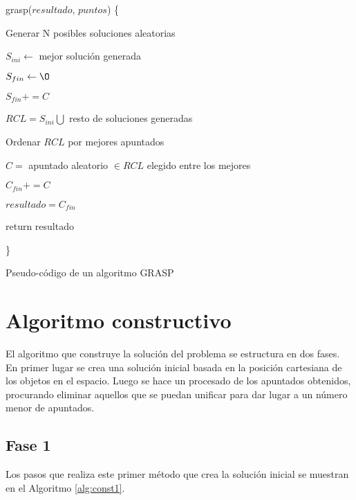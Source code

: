 \begin{algorithm}[H]
grasp($resultado$, $puntos$) \{

	Generar N posibles soluciones aleatorias
  
  $S_{ini} \leftarrow$ mejor solución generada

  $S_{fin} \leftarrow \O$

   {

     {$S_{fin} += C$}
  }

  $RCL = S_{ini}\bigcup$ resto de soluciones generadas

	Ordenar $RCL$ por mejores apuntados

   { %

  	$C = $ apuntado aleatorio $\in RCL$ elegido entre los mejores

    $C_{fin} += C$
  }

   {$resultado = C_{fin}$}

  return resultado

\}

\caption{Pseudo-código de un algoritmo GRASP}
\label{alg:grasp}
\end{algorithm}

\section{Algoritmo constructivo} \label{sec:algconst}

El algoritmo que construye la solución del problema se estructura en dos fases. 
En primer lugar se crea una solución inicial basada en la posición
cartesiana de los objetos en el espacio. Luego se hace un procesado de los
apuntados obtenidos, procurando eliminar aquellos que se puedan unificar para
dar lugar a un número menor de apuntados.

\subsection{Fase 1}
Los pasos que realiza este primer método que crea la solución inicial se
muestran en el Algoritmo \ref{alg:const1}.

